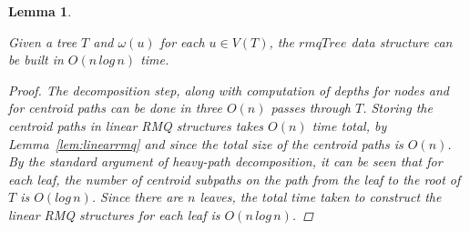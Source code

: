 \documentclass{article}
\newcommand{\weight}{\omega}
\newtheorem{rmqdatastructure}[incompatibility]{Lemma}
\begin{document}
    \begin{rmqdatastructure}
        \label{lem:rmqdatastructure}

        Given a tree $T$ and $\weight(u)$ for each $u \in V(T)$, the $rmqTree$ data structure can be built in $O(n\,log\,n)$ time.

        \begin{proof}
            The decomposition step, along with computation of depths for nodes and for centroid paths can be done in three $O(n)$ passes through $T$. Storing the centroid paths in linear RMQ structures takes $O(n)$ time total, by Lemma~\ref{lem:linearrmq} and since the total size of the centroid paths is $O(n)$. By the standard argument of heavy-path decomposition, it can be seen that for each leaf, the number of centroid subpaths on the path from the leaf to the root of $T$ is $O(log\,n)$. Since there are $n$ leaves, the total time taken to construct the linear RMQ structures for each leaf is $O(n\,log\,n)$.
        \end{proof}
    \end{rmqdatastructure}
\end{document}

